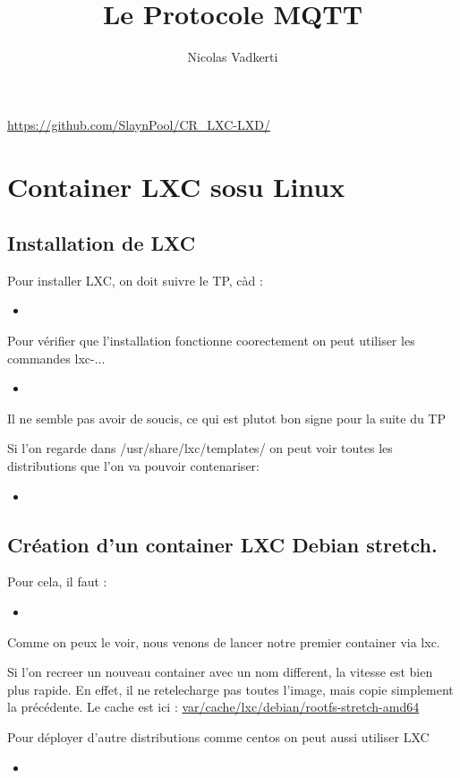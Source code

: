 \documentclass[10pt,a4paper]{article}
\title{Le Protocole MQTT}
\author{Nicolas Vadkerti}
\newcommand{\insertcode}[2]{\begin{itemize}\item[]\end{itemize}}
\begin{document}
\maketitle


\url{https://github.com/SlaynPool/CR_LXC-LXD/}

\section {Container LXC sosu Linux}
\subsection{Installation de LXC}
Pour installer LXC, on doit suivre le TP, càd :
\insertcode{commande/1.txt}{Installation de LXC}

 Pour vérifier que l'installation fonctionne coorectement on peut utiliser les commandes lxc-...
 \insertcode{commande/2.txt}{Verification de LXC}
 Il ne semble pas avoir de soucis, ce qui est plutot bon signe pour la suite du TP 

 Si l'on regarde dans /usr/share/lxc/templates/ on peut voir toutes les distributions que l'on va pouvoir contenariser:
 \insertcode{commande/3.txt}{listes des distributions contenarisables}
 
 
 \subsection{Création d’un container LXC Debian stretch.}
 
 
 Pour cela, il faut :
 \insertcode{commande/4.txt}{premier container}
 Comme on peux le voir, nous venons de lancer notre premier container via lxc.
 
 Si l'on recreer un nouveau container avec un nom different, la vitesse est bien plus rapide. En effet, il ne retelecharge pas toutes l'image, mais copie simplement la précédente. Le cache est ici : \url{var/cache/lxc/debian/rootfs-stretch-amd64}
 
 
 Pour déployer d'autre distributions comme centos on peut aussi utiliser LXC
 \insertcode{commande/5.txt}{LXC centos}
 
\end{document}
